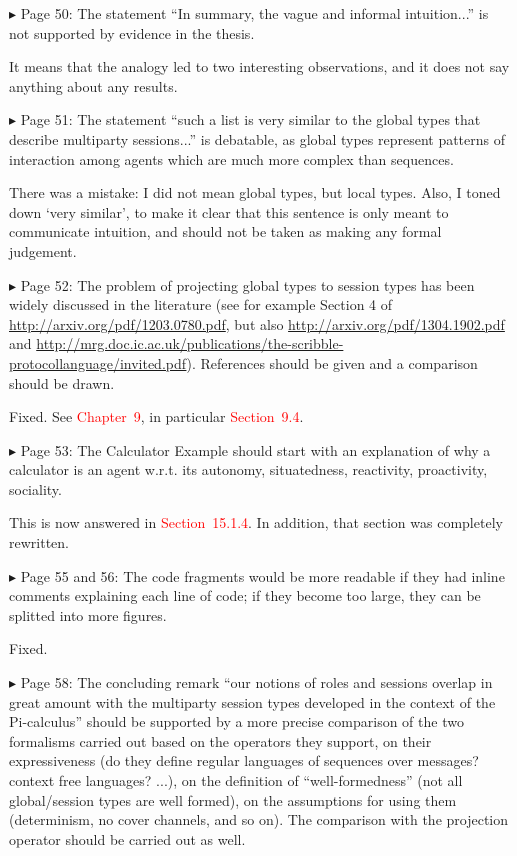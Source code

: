 \documentclass{article}
\newcommand*\R[1]{\textcolor{red}{#1}} %
\newenvironment{them}%
  {\bigskip\noindent\begingroup\color{blue}$\blacktriangleright$\enspace}%
  {\endgroup\par}
\begin{document}
\begin{them}
Page 50:
The statement ``In summary, the vague and informal intuition...'' is not
supported by evidence in the thesis.
\end{them}
It means that the analogy led to two interesting observations, and it does not
say anything about any results.

\begin{them}
Page 51:
The statement ``such a list is very similar to the global types that describe
multiparty sessions...'' is debatable, as global types represent patterns of
interaction among agents which are much more complex than sequences.
\end{them}

There was a mistake: I did not mean global types, but local types.
Also, I toned down `very similar',
  to make it clear that this sentence is only meant to communicate intuition,
and should not be taken as making any formal judgement.


\begin{them}
Page 52:
The problem of projecting global types to session types has been widely
discussed in the literature (see for example Section 4 of
\url{http://arxiv.org/pdf/1203.0780.pdf}, but also
\url{http://arxiv.org/pdf/1304.1902.pdf} and
\url{http://mrg.doc.ic.ac.uk/publications/the-scribble-protocollanguage/invited.pdf}).
References should be given and a comparison should be drawn.
\end{them}

Fixed.
See \R{Chapter~9},
  in particular \R{Section~9.4}.

\begin{them}
Page 53:
The Calculator Example should start with an explanation of why a calculator is
an agent w.r.t. its autonomy, situatedness, reactivity, proactivity, sociality.
\end{them}
This is now answered in \R{Section~15.1.4}.
In addition, that section was completely rewritten.


\begin{them}
Page 55 and 56:
The code fragments would be more readable if they had inline comments
explaining each line of code; if they become too large, they can be splitted
into more figures.
\end{them}
Fixed.

\begin{them}
Page 58:
The concluding remark ``our notions of roles and sessions overlap in great
amount with the multiparty session types developed in the context of the
Pi-calculus'' should be supported by a more precise comparison of the two
formalisms carried out based on the operators they support, on their
expressiveness (do they define regular languages of sequences over messages?
context free languages? ...), on the definition of ``well-formedness'' (not all
global/session types are well formed), on the assumptions for using them
(determinism, no cover channels, and so on). The comparison with the projection
operator should be carried out as well.
\end{them}
\end{document}
